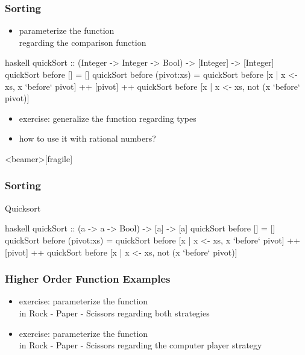 \documentclass[dvipsnames]{beamer}
\theoremstyle{plain}
\begin{document}
\begin{frame}[fragile]
  \frametitle{Sorting}

  \begin{itemize}
    \item parameterize the  function\\
      regarding the comparison function
  \end{itemize}

  \begin{exampleblock}{}
    \begin{pygments}{haskell}
quickSort :: (Integer -> Integer -> Bool)
                 -> [Integer] -> [Integer]
quickSort before []         = []
quickSort before (pivot:xs) =
    quickSort before [x | x <- xs, x `before` pivot]
    ++ [pivot]
    ++ quickSort before [x | x <- xs,
                             not (x `before` pivot)]
    \end{pygments}
  \end{exampleblock}

  \pause
  \begin{itemize}
    \item exercise: generalize the function regarding types
    \item how to use it with rational numbers?
  \end{itemize}
\end{frame}

\begin{frame}<beamer>[fragile]
  \frametitle{Sorting}

  \begin{exampleblock}{Quicksort}
    \begin{pygments}{haskell}
quickSort :: (a -> a -> Bool) -> [a] -> [a]
quickSort before []         = []
quickSort before (pivot:xs) =
    quickSort before [x | x <- xs, x `before` pivot]
    ++ [pivot]
    ++ quickSort before [x | x <- xs,
                             not (x `before` pivot)]
    \end{pygments}
  \end{exampleblock}
\end{frame}

\begin{frame}
  \frametitle{Higher Order Function Examples}

  \begin{itemize}
    \item exercise: parameterize the  function\\
      in Rock - Paper - Scissors regarding both strategies
    \item exercise: parameterize the  function\\
      in Rock - Paper - Scissors regarding the computer player strategy
  \end{itemize}
\end{frame}
\end{document}
